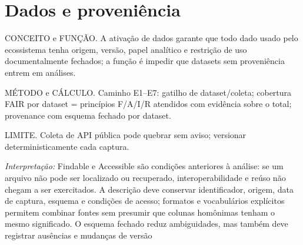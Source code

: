 \section{Dados e proveniência}
\begin{descricao}
CONCEITO e FUNÇÃO. A ativação de dados garante que todo dado usado pelo
ecossistema tenha origem, versão, papel analítico e restrição de uso
documentalmente fechados; a função é impedir que datasets sem proveniência
entrem em análises.
\end{descricao}
\begin{metodo}
MÉTODO e CÁLCULO. Caminho E1--E7: gatilho de dataset/coleta; cobertura FAIR por
dataset = princípios F/A/I/R atendidos com evidência sobre o total; provenance
com esquema fechado por dataset.
\end{metodo}
\begin{aviso}
LIMITE. Coleta de API pública pode quebrar sem aviso; versionar
deterministicamente cada captura.
\end{aviso}
\noindent\textit{Interpretação:} Findable e Accessible são condições anteriores à análise: se um arquivo não pode ser localizado ou recuperado, interoperabilidade e reúso não chegam a ser exercitados. A descrição deve conservar identificador, origem, data de captura, esquema e condições de acesso; formatos e vocabulários explícitos permitem combinar fontes sem presumir que colunas homônimas tenham o mesmo significado. O esquema fechado reduz ambiguidades, mas também deve registrar ausências e mudanças de versão  %
